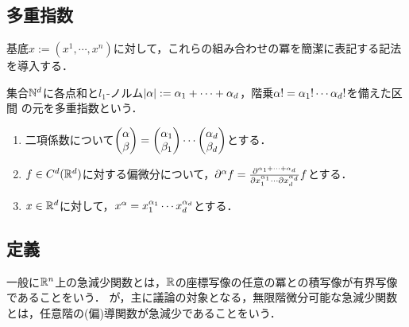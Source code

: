 \documentclass[uplatex,dvipdfmx]{jsreport}
\begin{document}
\subsection{多重指数}

\begin{tcolorbox}[colframe=ForestGreen, colback=ForestGreen!10!white,breakable,colbacktitle=ForestGreen!40!white,coltitle=black,fonttitle=\bfseries\sffamily,
title=]
    基底$x:=(x^1,\cdots,x^n)$に対して，これらの組み合わせの冪を簡潔に表記する記法を導入する．
\end{tcolorbox}

\begin{definition}
    集合$\mathbb{N}^d$に各点和と$l_1$-ノルム$\lvert\alpha\rvert:=\alpha_1+\cdots+\alpha_d$，階乗$\alpha!=\alpha_1!\cdots\alpha_d!$を備えた区間
    の元を多重指数という．
    \begin{enumerate}
        \item 二項係数について$\begin{pmatrix}\alpha\\\beta\end{pmatrix}=\begin{pmatrix}\alpha_1\\\beta_1\end{pmatrix}\cdots\begin{pmatrix}\alpha_d\\\beta_d\end{pmatrix}$とする．
        \item $f\in C^d(\mathbb{R}^d)$に対する偏微分について，$\partial^\alpha f=\frac{\partial^{\alpha_1+\cdots+\alpha_d}}{\partial x_1^{\alpha_1}\cdots\partial x_d^{\alpha_d}}f$とする．
        \item $x\in\mathbb{R}^d$に対して，$x^\alpha=x_1^{\alpha_1}\cdots x_d^{\alpha_d}$とする．
    \end{enumerate}
\end{definition}

\subsection{定義}

\begin{tcolorbox}[colframe=ForestGreen, colback=ForestGreen!10!white,breakable,colbacktitle=ForestGreen!40!white,coltitle=black,fonttitle=\bfseries\sffamily,
title=]
    一般に$\mathbb{R}^n$上の急減少関数とは，$\mathbb{R}$の座標写像の任意の冪との積写像が有界写像であることをいう．
    が，主に議論の対象となる，無限階微分可能な急減少関数とは，任意階の(偏)導関数が急減少であることをいう．
\end{tcolorbox}
\end{document}
